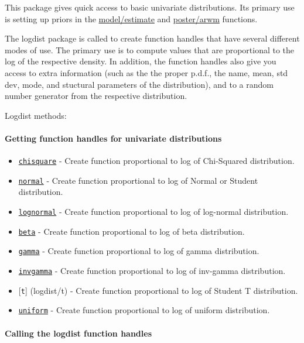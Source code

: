 

	This package gives quick access to basic univariate distributions. Its
 primary use is setting up priors in the \url{model/estimate} and
 \url{poster/arwm} functions.
 
 The logdist package is called to create function handles that have
 several different modes of use. The primary use is to compute values
 that are proportional to the log of the respective density. In addition,
 the function handles also give you access to extra information (such as
 the the proper p.d.f., the name, mean, std dev, mode, and stuctural
 parameters of the distribution), and to a random number generator from
 the respective distribution.
 
 Logdist methods:
 
 \paragraph{Getting function handles for univariate distributions}
 
 \begin{itemize}
 \item
   \href{logdist/chisquare}{\texttt{chisquare}} - Create function
   proportional to log of Chi-Squared distribution.
 \item
   \href{logdist/normal}{\texttt{normal}} - Create function proportional
   to log of Normal or Student distribution.
 \item
   \href{logdist/lognormal}{\texttt{lognormal}} - Create function
   proportional to log of log-normal distribution.
 \item
   \href{logdist/beta}{\texttt{beta}} - Create function proportional to
   log of beta distribution.
 \item
   \href{logdist/gamma}{\texttt{gamma}} - Create function proportional to
   log of gamma distribution.
 \item
   \href{logdist/invgamma}{\texttt{invgamma}} - Create function
   proportional to log of inv-gamma distribution.
 \item
   {[}\texttt{t}{]} (logdist/t) - Create function proportional to log of
   Student T distribution.
 \item
   \href{logdist/uniform}{\texttt{uniform}} - Create function
   proportional to log of uniform distribution.
 \end{itemize}
 
 \paragraph{Calling the logdist function handles}
 
